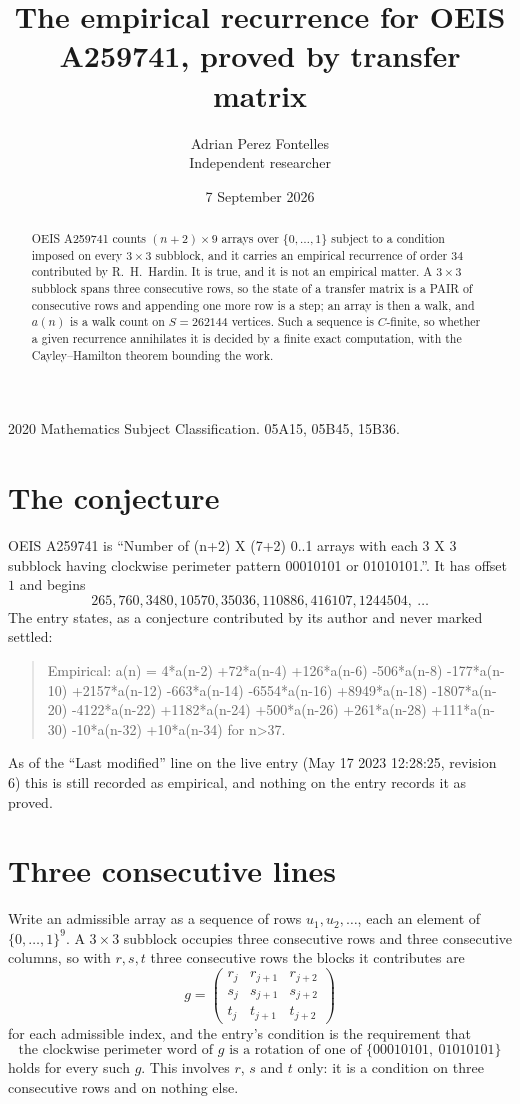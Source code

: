 \documentclass[11pt,a4paper]{article}
\title{The empirical recurrence for OEIS A259741, proved by transfer matrix}
\author{Adrian Perez Fontelles\\ \small Independent researcher}
\date{7 September 2026}
\theoremstyle{plain}
\theoremstyle{definition}
\begin{document}
\maketitle

\begin{abstract}
OEIS A259741 counts $(n+2)\times9$ arrays over $\{0,\dots,1\}$ subject to a condition imposed on
every $3\times3$ subblock, and it carries an empirical recurrence of order $34$
contributed by R.~H.~Hardin. It is true, and it is not an empirical matter. A $3\times3$
subblock spans three consecutive rows, so the state of a transfer matrix is a PAIR of
consecutive rows and appending one more row is a step; an array is then a walk, and
$a(n)$ is a walk count on $S=262144$ vertices. Such a sequence is $C$-finite, so whether a given
recurrence annihilates it is decided by a finite exact computation, with the Cayley--Hamilton
theorem bounding the work.
\end{abstract}

\noindent\small 2020 Mathematics Subject Classification. 05A15, 05B45, 15B36.\normalsize

\section{The conjecture}

OEIS A259741 is ``Number of (n+2) X (7+2) 0..1 arrays with each 3 X 3 subblock having clockwise perimeter pattern 00010101 or 01010101.''. It has offset $1$ and begins
\[
265, 760, 3480, 10570, 35036, 110886, 416107, 1244504,\ \dots
\]
The entry states, as a conjecture contributed by its author and never marked settled:
\begin{quote}
Empirical: a(n) = 4*a(n-2) +72*a(n-4) +126*a(n-6) -506*a(n-8) -177*a(n-10) +2157*a(n-12) -663*a(n-14) -6554*a(n-16) +8949*a(n-18) -1807*a(n-20) -4122*a(n-22) +1182*a(n-24) +500*a(n-26) +261*a(n-28) +111*a(n-30) -10*a(n-32) +10*a(n-34) for n>37.
\end{quote}
As of the ``Last modified'' line on the live entry (May 17 2023 12:28:25, revision 6) this is still
recorded as empirical, and nothing on the entry records it as proved.

\section{Three consecutive lines}

Write an admissible array as a sequence of rows $u_1,u_2,\dots$, each an element of
$\{0,\dots,1\}^{9}$. A $3\times3$ subblock occupies three consecutive rows and
three consecutive columns, so with $r,s,t$ three consecutive rows the blocks it
contributes are
\[
g=\begin{pmatrix}r_j&r_{j+1}&r_{j+2}\\ s_j&s_{j+1}&s_{j+2}\\ t_j&t_{j+1}&t_{j+2}\end{pmatrix}
\]
for each admissible index, and the entry's condition is the requirement that
\[
\text{the clockwise perimeter word of }g\text{ is a rotation of one of }\{00010101,\ 01010101\}
\]
holds for every such $g$. This involves $r$, $s$ and $t$ only: it is a condition on
three consecutive rows and on nothing else.
\end{document}
